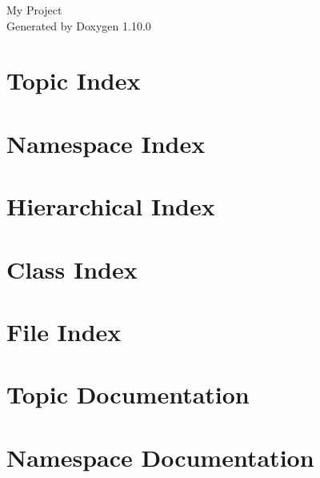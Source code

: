 \documentclass[twoside]{book}
\newcommand{\+}{\discretionary{\mbox{\scriptsize$\hookleftarrow$}}{}{}}
\newcommand{\clearemptydoublepage}{%
    \newpage{\pagestyle{empty}\cleardoublepage}%
  }
\begin{document}
  \raggedbottom
    \hypersetup{pageanchor=false,
                bookmarksnumbered=true,
                pdfencoding=unicode
               }
  \begin{titlepage}
  \vspace*{7cm}
  \begin{center}%
  {\Large My Project}\\
  \vspace*{1cm}
  {\large Generated by Doxygen 1.10.0}\\
  \end{center}
  \end{titlepage}
  \clearemptydoublepage
  \tableofcontents
  \clearemptydoublepage
  \hypersetup{pageanchor=true}






\chapter{Topic Index}

\chapter{Namespace Index}

\chapter{Hierarchical Index}

\chapter{Class Index}

\chapter{File Index}

\chapter{Topic Documentation}






\chapter{Namespace Documentation}








\end{document}
